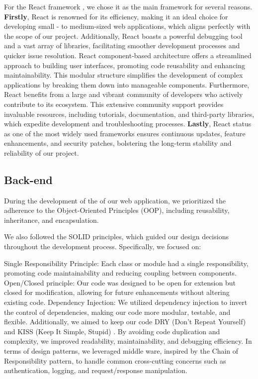 For the React framework \cite{react}, we chose it as the main  \cite{htmlcssjs} framework for several reasons. \textbf{Firstly}, React \cite{react} is renowned for its efficiency, making it an ideal choice for developing small - to medium-sized web applications, which aligns perfectly with the scope of our project. Additionally, React \cite{react} boasts a powerful debugging tool and a vast array of libraries, facilitating smoother development processes and quicker issue resolution.
React \cite{react} component-based architecture offers a streamlined approach to building user interfaces, promoting code reusability and enhancing maintainability. This modular structure simplifies the development of complex applications by breaking them down into manageable components.
Furthermore, React \cite{react} benefits from a large and vibrant community of developers who actively contribute to its ecosystem. This extensive community support provides invaluable resources, including tutorials, documentation, and third-party libraries, which expedite development and troubleshooting processes. \textbf{Lastly}, React \cite{react} status as one of the most widely used  frameworks ensures continuous updates, feature enhancements, and security patches, bolstering the long-term stability and reliability of our project.

\subsection{Back-end}\label{back}
During the development of the  of our web application, we prioritized the adherence to the Object-Oriented Principles (OOP), including reusability, inheritance, and encapsulation.

We also followed the SOLID principles, which guided our design decisions throughout the development process. Specifically, we focused on:

Single Responsibility Principle: Each class or module had a single responsibility, promoting code maintainability and reducing coupling between components.
Open/Closed principle: Our code was designed to be open for extension but closed for modification, allowing for future enhancements without altering existing code.
Dependency Injection: We utilized dependency injection to invert the control of dependencies, making our code more modular, testable, and flexible.
Additionally, we aimed to keep our code DRY (Don't Repeat Yourself) \cite{dry} and KISS (Keep It Simple, Stupid) \cite{kiss}. By avoiding code duplication and complexity, we improved readability, maintainability, and debugging efficiency. In terms of design patterns, we leveraged middle ware, inspired by the Chain of Responsibility pattern, to handle common cross-cutting concerns such as authentication, logging, and request/response manipulation.

